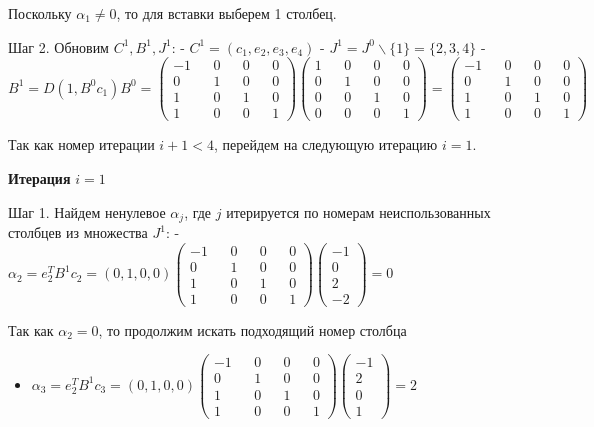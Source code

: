 \documentclass[11pt]{article}
\providecommand{\tightlist}{%
      \setlength{\itemsep}{0pt}\setlength{\parskip}{0pt}}
\begin{document}
Поскольку \(\alpha_1 \ne 0\), то для вставки выберем 1 столбец.

Шаг 2. Обновим \(C^1, B^1, J^1\): - \(C^1 = (c_1, e_2, e_3, e_4)\) -
\(J^1 = J^0 \backslash \{1\} = \{2, 3, 4 \}\) -
\(B^1 = D(1, B^0c_1)B^0 = \begin{pmatrix} -1 && 0 && 0 && 0 \\ 0 && 1 && 0 && 0 \\ 1 && 0 && 1 && 0 \\ 1 && 0 && 0 && 1 \end{pmatrix} \begin{pmatrix} 1 && 0 && 0 && 0 \\ 0 && 1 && 0 && 0 \\ 0 && 0 && 1 && 0 \\ 0 && 0 && 0 && 1 \end{pmatrix} = \begin{pmatrix} -1 && 0 && 0 && 0 \\ 0 && 1 && 0 && 0 \\ 1 && 0 && 1 && 0 \\ 1 && 0 && 0 && 1 \end{pmatrix}\)

Так как номер итерации \(i + 1 < 4\), перейдем на следующую итерацию
\(i = 1\).

\textbf{Итерация} \(i = 1\)

Шаг 1. Найдем ненулевое \(\alpha_j\), где \(j\) итерируется по номерам
неиспользованных столбцев из множества \(J^1\): -
\(\alpha_2 = e_2^TB^1c_2 = (0, 1, 0, 0) \begin{pmatrix} -1 && 0 && 0 && 0 \\ 0 && 1 && 0 && 0 \\ 1 && 0 && 1 && 0 \\ 1 && 0 && 0 && 1 \end{pmatrix} \begin{pmatrix}-1 \\ 0 \\ 2 \\ -2\end{pmatrix} = 0\)

Так как \(\alpha_2 = 0\), то продолжим искать подходящий номер столбца

\begin{itemize}
\tightlist
\item
  \(\alpha_3 = e_2^TB^1c_3 = (0, 1, 0, 0) \begin{pmatrix} -1 && 0 && 0 && 0 \\ 0 && 1 && 0 && 0 \\ 1 && 0 && 1 && 0 \\ 1 && 0 && 0 && 1 \end{pmatrix} \begin{pmatrix}-1 \\ 2 \\ 0 \\ 1\end{pmatrix} = 2\)
\end{itemize}
\end{document}
